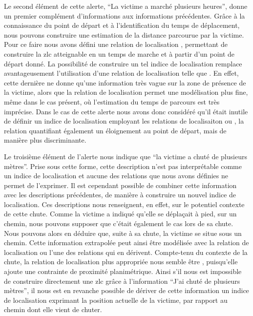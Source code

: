 Le second élément de cette alerte, \enquote{La victime a marché
  plusieurs heures}, donne un premier complément d'informations aux
informations précédentes. Grâce à la connaissance du point de départ
et à l'identification du temps de déplacement, nous pouvons construire
une estimation de la distance parcourue par la victime. Pour ce faire
nous avons défini une relation de localisation
, permettant de construire la
\ac{zlc} atteignable en un temps de marche et à partir d'un point de
départ donné. La possibilité de construire un tel indice de
localisation remplace avantageusement l'utilisation d'une relation de
localisation telle que . En effet, cette
dernière ne donne qu'une information très vague sur la zone de
présence de la victime, alors que la relation de localisation
 permet une modélisation plus
fine, même dans le cas présent, où l'estimation du temps de parcours
est très imprécise. Dans le cas de cette alerte nous avons donc
considéré qu'il était inutile de définir un indice de localisation
employant les relations de localisaiton 
ou , la relation
 quantifiant également un
éloignement au point de départ, mais de manière plus discriminante.

Le troisième élément de l'alerte nous indique que \enquote{la victime
  a chuté de plusieurs mètres}. Prise sous cette forme, cette
description n'est pas interprétable comme un indice de localisation et
aucune des relations que nous avons définies ne permet de
l'exprimer. Il est cependant possible de combiner cette information
avec les descriptions précédentes, de manière à construire un nouvel
indice de localisation. Ces descriptions nous renseignent, en effet,
sur le potentiel contexte de cette chute. Comme la victime a indiqué
qu'elle se déplaçait à pied, sur un chemin, nous pouvons supposer que
c'était également le cas lors de sa chute. Nous pouvons alors en
déduire que, suite à sa chute, la victime se situe sous un
chemin. Cette information extrapolée peut ainsi être modélisée avec la
relation de localisation  ou l'une des
relations qui en dérivent. Compte-tenu du contexte de la chute, la
relation de localisation plus appropriée nous semble être
, puisqu’elle ajoute une contrainte de
proximité planimétrique. Ainsi s'il nous est impossible de construire
directement une \ac{zlc} grâce à l'information \enquote{J'ai chuté de
  plusieurs mètres}, il nous est en revanche possible de dériver de
cette information un indice de localisation exprimant la position
actuelle de la victime, par rapport au chemin dont elle vient de
chuter.

